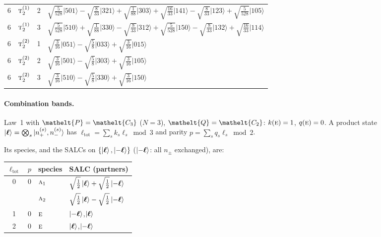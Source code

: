 \documentclass[11pt]{article}
\newcommand{\eltfont}[1]{{\let\sigma\eltsigma\mathelt{#1}}}
\newcommand{\irr}[1]{\text{\normalfont\scshape #1}}
\newcommand{\elt}[1]{\eltfont{#1}}
\newcommand{\occ}[1]{\lvert #1\rangle}
\newcommand{\pel}{\elt{P}}             %
\newcommand{\qel}{\elt{Q}}             %
\begin{document}
\begin{longtable}{c l c p{}}
6 & $\irr{t}_{2}^{(1)}$ & 2 & $\sqrt{\tfrac{5}{528}}\occ{501}-\sqrt{\tfrac{8}{33}}\occ{321}+\sqrt{\tfrac{1}{88}}\occ{303}+\sqrt{\tfrac{16}{33}}\occ{141}-\sqrt{\tfrac{8}{33}}\occ{123}+\sqrt{\tfrac{5}{528}}\occ{105}$\\
6 & $\irr{t}_{2}^{(1)}$ & 3 & $\sqrt{\tfrac{5}{528}}\occ{510}+\sqrt{\tfrac{1}{88}}\occ{330}-\sqrt{\tfrac{8}{33}}\occ{312}+\sqrt{\tfrac{5}{528}}\occ{150}-\sqrt{\tfrac{8}{33}}\occ{132}+\sqrt{\tfrac{16}{33}}\occ{114}$\\
6 & $\irr{t}_{2}^{(2)}$ & 1 & $\sqrt{\tfrac{3}{16}}\occ{051}-\sqrt{\tfrac{5}{8}}\occ{033}+\sqrt{\tfrac{3}{16}}\occ{015}$\\
6 & $\irr{t}_{2}^{(2)}$ & 2 & $\sqrt{\tfrac{3}{16}}\occ{501}-\sqrt{\tfrac{5}{8}}\occ{303}+\sqrt{\tfrac{3}{16}}\occ{105}$\\
6 & $\irr{t}_{2}^{(2)}$ & 3 & $\sqrt{\tfrac{3}{16}}\occ{510}-\sqrt{\tfrac{5}{8}}\occ{330}+\sqrt{\tfrac{3}{16}}\occ{150}$\\
\hline
\end{longtable}

\paragraph{Combination bands.}

Law~1 with $\pel=\elt{C_{3}}$ ($N=3$), $\qel=\elt{C_{2}}$: $k(\irr{e})=1$, $q(\irr{e})=0$. A product state $\ket{\boldsymbol\ell}=\bigotimes_s\ket{n_+^{(s)},n_-^{(s)}}$ has $\ell_{\mathrm{tot}}=\sum_sk_s\ell_s\bmod 3$ and parity $p=\sum_sq_s\ell_s\bmod2$.

Its species, and the SALCs on $\{\ket{\boldsymbol\ell},\ket{-\boldsymbol\ell}\}$ ($\ket{-\boldsymbol\ell}$: all $n_\pm$ exchanged), are:

\begin{longtable}{c c l l}\hline $\ell_{\mathrm{tot}}$ & $p$ & species & SALC (partners)\\ \hline\endhead

0 & 0 & $\irr{a}_{1}$ & $\sqrt{\tfrac{1}{2}}\ket{\boldsymbol\ell}+\sqrt{\tfrac{1}{2}}\ket{-\boldsymbol\ell}$\\

& & $\irr{a}_{2}$ & $\sqrt{\tfrac{1}{2}}\ket{\boldsymbol\ell}-\sqrt{\tfrac{1}{2}}\ket{-\boldsymbol\ell}$\\

1 & 0 & $\irr{e}$ & $\ket{-\boldsymbol\ell}$,\quad $\ket{\boldsymbol\ell}$\\

2 & 0 & $\irr{e}$ & $\ket{\boldsymbol\ell}$,\quad $\ket{-\boldsymbol\ell}$\\

\hline\end{longtable}
\end{document}
